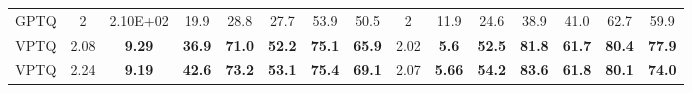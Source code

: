 \begin{table}[hbt!]
{\begin{tabular}{c|ccccccc|ccccccc}
GPTQ              & 2                    & 2.10E+02             & 19.9                 & 28.8                 & 27.7                 & 53.9                 & 50.5                 & 2                    & 11.9                 & 24.6                 & 38.9                 & 41.0                 & 62.7                 & 59.9                 \\
VPTQ              & 2.08                 & \textbf{9.29}        & \textbf{36.9}        & \textbf{71.0}        & \textbf{52.2}        & \textbf{75.1}        & \textbf{65.9}        & 2.02                 & \textbf{5.6}         & \textbf{52.5}        & \textbf{81.8}        & \textbf{61.7}        & \textbf{80.4}        & \textbf{77.9}        \\
VPTQ              & 2.24                 & \textbf{9.19}        & \textbf{42.6}        & \textbf{73.2}        & \textbf{53.1}        & \textbf{75.4}        & \textbf{69.1}        & 2.07                 & \textbf{5.66}        & \textbf{54.2}        & \textbf{83.6}        & \textbf{61.8}        & \textbf{80.1}        & \textbf{74.0}        \\ \hline
\end{tabular}%
}
\end{table}